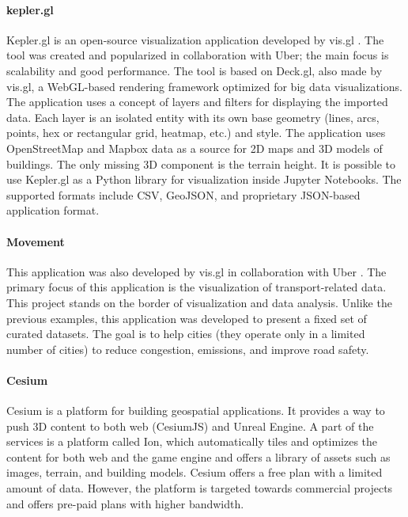 \paragraph{kepler.gl}
Kepler.gl \cite{uberKepler} is an open-source visualization application developed by vis.gl \cite{visgl}. The tool was created and popularized in collaboration with Uber; the main focus is scalability and good performance. The tool is based on Deck.gl, also made by vis.gl, a WebGL-based rendering framework optimized for big data visualizations. The application uses a concept of layers and filters for displaying the imported data. Each layer is an isolated entity with its own base geometry (lines, arcs, points, hex or rectangular grid, heatmap, etc.) and style. 
The application uses OpenStreetMap \cite{openstreetmap} and Mapbox \cite{mapbox} data as a source for 2D maps and 3D models of buildings. The only missing 3D component is the terrain height. It is possible to use Kepler.gl as a Python library for visualization inside Jupyter Notebooks. The supported formats include CSV, GeoJSON, and proprietary JSON-based application format. 

\paragraph{Movement}
This application was also developed by vis.gl in collaboration with Uber \cite{uberMovement}. The primary focus of this application is the visualization of transport-related data. This project stands on the border of visualization and data analysis. Unlike the previous examples, this application was developed to present a fixed set of curated datasets. The goal is to help cities (they operate only in a limited number of cities) to reduce congestion, emissions, and improve road safety.

\paragraph{Cesium}
Cesium \cite{ce2019cesiumjs} is a platform for building geospatial applications. It provides a way to push 3D content to both web (CesiumJS) and Unreal Engine. A part of the services is a platform called Ion, which automatically tiles and optimizes the content for both web and the game engine and offers a library of assets such as images, terrain, and building models. Cesium offers a free plan with a limited amount of data. However, the platform is targeted towards commercial projects and offers pre-paid plans with higher bandwidth.

